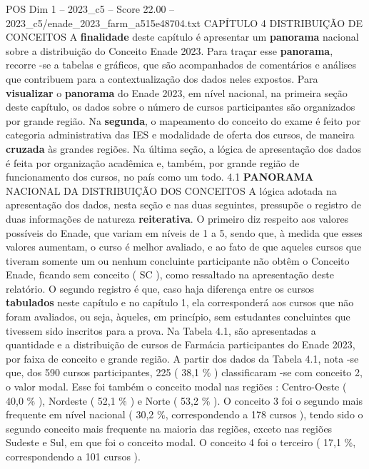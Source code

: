 \begin{textsample}{POS Dim 1 – 2023\_c5 – Score 22.00 – 2023\_c5/enade\_2023\_farm\_a515e48704.txt}  \label{ex:f1_pos_012}
CAPÍTULO 4 DISTRIBUIÇÃO DE CONCEITOS A \textbf{finalidade} deste capítulo é apresentar um \textbf{panorama} nacional sobre a distribuição do Conceito Enade 2023.
Para traçar esse \textbf{panorama}, recorre -se a tabelas e gráficos, que são acompanhados de comentários e análises que contribuem para a contextualização dos dados neles expostos.
Para \textbf{visualizar} o \textbf{panorama} do Enade 2023, em nível nacional, na primeira seção deste capítulo, os dados sobre o número de cursos participantes são organizados por grande região.
Na \textbf{segunda}, o mapeamento do conceito do exame é feito por categoria administrativa das IES e modalidade de oferta dos cursos, de maneira \textbf{cruzada} às grandes regiões.
Na última seção, a lógica de apresentação dos dados é feita por organização acadêmica e, também, por grande região de funcionamento dos cursos, no país como um todo. 4.1 \textbf{PANORAMA} NACIONAL DA DISTRIBUIÇÃO DOS CONCEITOS A lógica adotada na apresentação dos dados, nesta seção e nas duas seguintes, pressupõe o registro de duas informações de natureza \textbf{reiterativa}.
O primeiro diz respeito aos valores possíveis do Enade, que variam em níveis de 1 a 5, sendo que, à medida que esses valores aumentam, o curso é melhor avaliado, e ao fato de que aqueles cursos que tiveram somente um ou nenhum concluinte participante não obtêm o Conceito Enade, ficando sem conceito ( SC ), como ressaltado na apresentação deste relatório.
O segundo registro é que, caso haja diferença entre os cursos \textbf{tabulados} neste capítulo e no capítulo 1, ela corresponderá aos cursos que não foram avaliados, ou seja, àqueles, em princípio, sem estudantes concluintes que tivessem sido inscritos para a prova.
Na Tabela 4.1, são apresentadas a quantidade e a distribuição de cursos de Farmácia participantes do Enade 2023, por faixa de conceito e grande região.
A partir dos dados da Tabela 4.1, nota -se que, dos 590 cursos participantes, 225 ( 38,1 \% ) classificaram -se com conceito 2, o valor modal.
Esse foi também o conceito modal nas regiões : Centro-Oeste ( 40,0 \% ), Nordeste ( 52,1 \% ) e Norte ( 53,2 \% ).
O conceito 3 foi o segundo mais frequente em nível nacional ( 30,2 \%, correspondendo a 178 cursos ), tendo sido o segundo conceito mais frequente na maioria das regiões, exceto nas regiões Sudeste e Sul, em que foi o conceito modal.
O conceito 4 foi o terceiro ( 17,1 \%, correspondendo a 101 cursos ).

\end{textsample}
